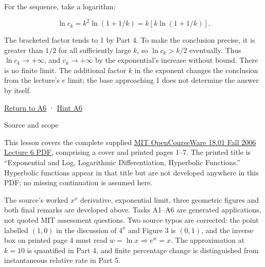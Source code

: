 \documentclass[
  11pt,
]{article}
\providecommand{\gt}{>}
\begin{document}
For the sequence, take a logarithm:

\[
\ln c_k=k^2\ln(1+1/k)
=k\left[k\ln(1+1/k)\right].
\]

The bracketed factor tends to 1 by Part 4. To make the conclusion
precise, it is greater than \(1/2\) for all sufficiently large \(k\), so
\(\ln c_k\gt k/2\) eventually. Thus \(\ln c_k\to+\infty\), and
\(c_k\to+\infty\) by the exponential's increase without bound. There is
no finite limit. The additional factor \(k\) in the exponent changes the
conclusion from the lecture's \(e\) limit; the base approaching 1 does
not determine the answer by itself.

\protect\hyperlink{task-a6}{Return to A6} ·
\protect\hyperlink{hint-a6}{Hint A6}

Source and scope

This lesson covers the complete supplied
\href{https://ocw.mit.edu/courses/18-01-single-variable-calculus-fall-2006/f9af0e98490296c99d330faf47389507_lec6.pdf}{MIT
OpenCourseWare 18.01 Fall 2006 Lecture 6 PDF}, comprising a cover and
printed pages 1--7. The printed title is ``Exponential and Log,
Logarithmic Differentiation, Hyperbolic Functions.'' Hyperbolic
functions appear in that title but are not developed anywhere in this
PDF; no missing continuation is assumed here.

The source's worked \(x^x\) derivative, exponential limit, three
geometric figures and both final remarks are developed above. Tasks
A1--A6 are generated applications, not quoted MIT assessment questions.
Two source typos are corrected: the point labelled \((1,0)\) in the
discussion of \(4^x\) and Figure 3 is \((0,1)\), and the inverse box on
printed page 4 must read \(w=\ln x\Rightarrow e^w=x\). The approximation
at \(k=10\) is quantified in Part 4, and finite percentage change is
distinguished from instantaneous relative rate in Part 5.
\end{document}
